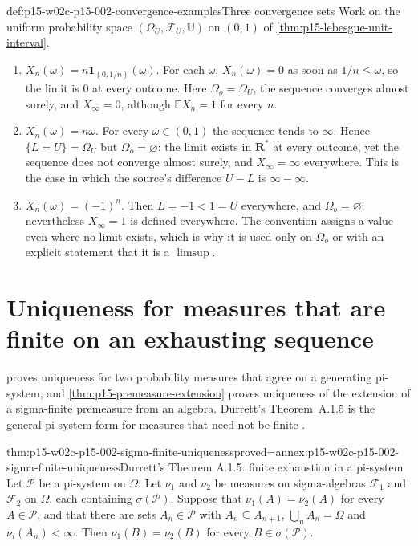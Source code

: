 \begin{hbexample}{def:p15-w02c-p15-002-convergence-examples}{Three convergence sets}
Work on the uniform probability space
\((\Omega_U,\mathcal F_U,\mathbb U)\) on \((0,1)\) of
\cref{thm:p15-lebesgue-unit-interval}.
\begin{enumerate}
\item \(X_n(\omega)=n\mathbf1_{(0,1/n)}(\omega)\). For each \(\omega\),
      \(X_n(\omega)=0\) as soon as \(1/n\leq\omega\), so the limit is \(0\)
      at every outcome. Here \(\Omega_o=\Omega_U\), the sequence converges
      almost surely, and \(X_\infty=0\), although \(\mathbb E X_n=1\) for
      every \(n\).
\item \(X_n(\omega)=n\omega\). For every \(\omega\in(0,1)\) the sequence
      tends to \(\infty\). Hence \(\{L=U\}=\Omega_U\) but
      \(\Omega_o=\varnothing\): the limit exists in \(\mathbf R^*\) at
      every outcome, yet the sequence does not converge almost surely, and
      \(X_\infty=\infty\) everywhere. This is the case in which the
      source's difference \(U-L\) is \(\infty-\infty\).
\item \(X_n(\omega)=(-1)^n\). Then \(L=-1<1=U\) everywhere, and
      \(\Omega_o=\varnothing\); nevertheless \(X_\infty=1\) is defined
      everywhere. The convention assigns a value even where no limit
      exists, which is why it is used only on \(\Omega_o\) or with an
      explicit statement that it is a \(\limsup\).
\end{enumerate}
\end{hbexample}

\section{Uniqueness for measures that are finite on an exhausting sequence}
\label{sec:p15-w02c-p15-002-sigma-finite-uniqueness}

 proves uniqueness for two probability
measures that agree on a generating pi-system, and
\cref{thm:p15-premeasure-extension} proves uniqueness of the extension of a
sigma-finite premeasure from an algebra. Durrett's Theorem~A.1.5 is the
general pi-system form for measures that need not be finite
\cite[Theorem~A.1.5, pp.~457--458]{DurrettPTEAuthor2019}.

\begin{hbtheorem}{thm:p15-w02c-p15-002-sigma-finite-uniqueness}{proved=annex:p15-w02c-p15-002-sigma-finite-uniqueness}{Durrett's Theorem A.1.5: finite exhaustion in a pi-system}
Let \(\mathcal P\) be a pi-system on \(\Omega\). Let \(\nu_1\) and \(\nu_2\)
be measures on sigma-algebras \(\mathcal F_1\) and \(\mathcal F_2\) on
\(\Omega\), each containing \(\sigma(\mathcal P)\). Suppose that
\(\nu_1(A)=\nu_2(A)\) for every \(A\in\mathcal P\), and that there are sets
\(A_n\in\mathcal P\) with \(A_n\subseteq A_{n+1}\),
\(\bigcup_nA_n=\Omega\) and \(\nu_i(A_n)<\infty\). Then
\(\nu_1(B)=\nu_2(B)\) for every \(B\in\sigma(\mathcal P)\).
\end{hbtheorem}

